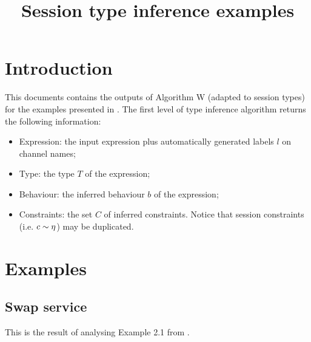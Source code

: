 \documentclass{article}
\title{Session type inference examples }
\begin{document}
\maketitle

\section{Introduction}
This documents contains the outputs of Algorithm W (adapted to session types)
for the examples presented in \cite{forte}. The first level of type
inference algorithm returns the following information:
\begin{itemize}
  \item Expression: the input expression plus automatically generated
  labels $l$ on channel names;
  \item Type: the type $ T $ of the expression;
  \item Behaviour: the inferred behaviour $b$ of the expression;
  \item Constraints: the set $C$ of inferred constraints. Notice that session
  constraints (i.e. $c \sim \eta $) may be duplicated.
\end{itemize}

\section{Examples}
\subsection{Swap service}
This is the result of analysing Example 2.1 from \cite{forte}.
\end{document}
